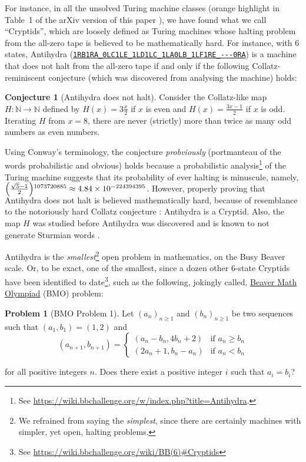 \documentclass[sigconf,screen]{acmart}
\theoremstyle{definition} %
\newtheorem{conjecture}{Conjecture}[section]
\newtheorem{problem}{Problem}[section]
\numberwithin{equation}{section}
\theoremstyle{definition} %
\newcommand{\tm}[1]{\href{https://bbchallenge.org/#1}{\texttt{\nolinkurl{#1}}}}
\begin{document}
For instance, in all the unsolved Turing machine classes (orange highlight in Table~1 of the arXiv version of this paper \cite{BB5}), we have found what we call ``Cryptids'', which are loosely defined as Turing machines whose halting problem from the all-zero tape is believed to be mathematically hard. For instance, with 6 states, Antihydra (\tm{1RB1RA_0LC1LE_1LD1LC_1LA0LB_1LF1RE_---0RA}) is a machine that does not halt from the all-zero tape if and only if the following Collatz-reminiscent conjecture (which was discovered from analysing the machine) holds:


\begin{conjecture}[Antihydra does not halt]
    Consider the Collatz-like map $H: \mathbb{N} \to \mathbb{N}$ defined by $H(x) = 3\frac{x}{2}$ if $x$ is even and $H(x) = \frac{3x-1}{2}$ if $x$ is odd. Iterating $H$ from $x=8$, there are never (strictly) more than twice as many odd numbers as even numbers.
\end{conjecture}

Using Conway's terminology, the conjecture \textit{probviously} (portmanteau of the words probabilistic and obvious) holds because a probabilistic analysis\footnote{See \url{https://wiki.bbchallenge.org/w/index.php?title=Antihydra}.} of the Turing machine suggests that its probability of ever halting is minuscule, namely, $\smash{\left(\frac{\sqrt{5}-1}{2}\right)}^{1073720885}\approx 4.84\times 10^{-224394395}$. However, properly proving that Antihydra does not halt is believed mathematically hard, because of resemblance to the notoriously hard Collatz conjecture \cite{LagariasCollatz}: Antihydra is a Cryptid. Also, the map $H$ was studied before Antihydra was discovered and is known to not generate Sturmian words \cite{DUBICKAS_2009}.

Antihydra is the \textit{smallest}\footnote{We refrained from saying the \textit{simplest}, since there are certainly machines with simpler, yet open, halting problems.} open problem in mathematics, on the Busy Beaver scale. Or, to be exact, one of the smallest, since a dozen other 6-state Cryptids have been identified to date\footnote{See \url{https://wiki.bbchallenge.org/wiki/BB(6)\#Cryptids}}, such as the following, jokingly called, \href{https://wiki.bbchallenge.org/wiki/Beaver_Math_Olympiad}{Beaver Math Olympiad} (BMO) problem:

\begin{problem}[BMO Problem 1]
Let $(a_n)_{n \ge 1}$ and $(b_n)_{n \ge 1}$ be two sequences such that $(a_1, b_1) = (1, 2)$ and
$$(a_{n+1}, b_{n+1}) = \begin{cases}
        (a_n-b_n, 4b_n+2) & \text{if }a_n \ge b_n \\
        (2a_n+1, b_n-a_n) & \text{if }a_n < b_n
    \end{cases}$$

\noindent for all positive integers $n$. Does there exist a positive integer $i$ such that $a_i = b_i$?
\end{problem}
\end{document}

